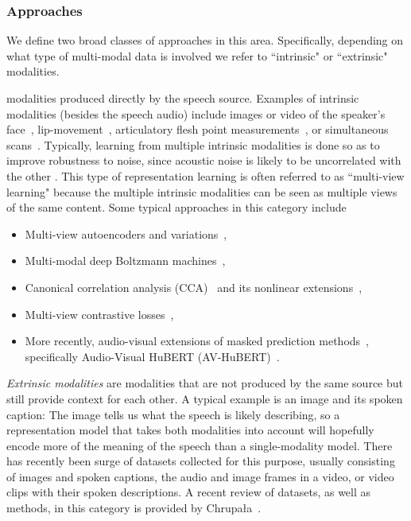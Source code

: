 \subsubsection{Approaches}
We define two broad classes of approaches in this area. Specifically, depending on what type of multi-modal data is involved we refer to ``intrinsic" or ``extrinsic" modalities.

modalities produced directly by the speech source.  Examples of intrinsic modalities (besides the speech audio) include images or video of the speaker's face~\cite{lee_avicar_2004,chung_lip_2016}, lip-movement~\cite{shi_learning_2022}, articulatory flesh point measurements~\cite{westbury_xray_1990,wrench_new_2001}, or simultaneous  scans~\cite{narayanan_multimodal_2011}.  Typically, learning from multiple intrinsic modalities is done so as to improve robustness to noise, since acoustic noise is likely to be uncorrelated with the other .  This type of representation learning is often referred to as ``multi-view learning" because the multiple intrinsic modalities can be seen as multiple views of the same content. Some typical approaches in this category include
\begin{itemize}
    \item Multi-view autoencoders and variations~\cite{ngiam_multimodal_2011,badino_integrating_2016},
    \item Multi-modal deep Boltzmann machines~\cite{srivastava_multimodal_2012},
    \item Canonical correlation analysis (CCA)~\cite{hotelling_relations_1936} and its nonlinear extensions~\cite{andrew_deep_2013,wang_deep_2015,wang_deep_2016,michaeli_nonparametric_2016,melzer_nonlinear_2001,lai_kernel_2000,lai_neural_1999,bach_probabilistic_2005,wang_unsupervised_2015},
    \item Multi-view contrastive losses~\cite{hermann_multilingual_2013,huang_learning_2013},
    \item More recently, audio-visual extensions of masked prediction methods~\cite{shi_learning_2022,shi_robust_2022}, specifically Audio-Visual HuBERT (AV-HuBERT)~\cite{shi_learning_2022}.
\end{itemize}

\textit{Extrinsic modalities} are modalities that are not produced by the same source but still provide context for each other. A typical example is an image and its spoken caption: The image tells us what the speech is likely describing, so a representation model that takes both modalities into account will hopefully encode more of the meaning of the speech than a single-modality model. 
There has recently been  surge of datasets collected for this purpose, usually consisting of images and spoken captions, the audio and image frames in a video, or video clips with their spoken descriptions. A recent review of datasets, as well as methods, in this category is provided by Chrupa\l{}a~\cite{chrupala_visually_2021}. 

